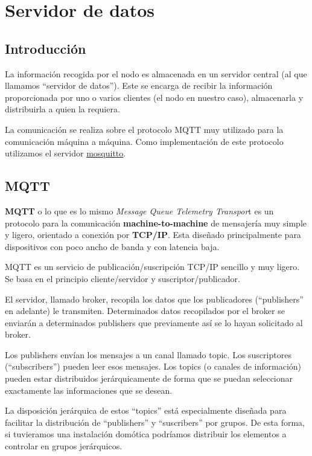 \cleardoublepage

\chapter{Servidor de datos}
\label{makereference3}

\section{Introducción}
\label{makereference3.1}
La información recogida por el nodo es almacenada en un servidor central (al que llamamos ``servidor de datos''). Este se encarga de recibir la información proporcionada por uno o varios clientes (el nodo en nuestro caso), almacenarla y distribuirla a quien la requiera.

La comunicación se realiza sobre el protocolo MQTT muy utilizado para la comunicación máquina a máquina. Como implementación de este protocolo utilizamos el servidor \href{https://mosquitto.org/}{mosquitto}.

\section{MQTT}
\label{makereference3.2}
\textbf{MQTT} o lo que es lo mismo \textit{Message Queue Telemetry Transpor}t es un protocolo para la comunicación \textbf{machine-to-machine} de mensajería muy simple y ligero, orientado a conexión por \textbf{TCP/IP}. Esta diseñado principalmente para dispositivos con poco ancho de banda y con latencia baja.

MQTT es un servicio de publicación/suscripción TCP/IP sencillo y muy ligero. Se basa en el principio cliente/servidor y suscriptor/publicador.

El servidor, llamado broker, recopila los datos que los publicadores (``publishers'' en adelante) le transmiten. Determinados datos recopilados por el broker se enviarán a determinados publishers que previamente así se lo hayan solicitado al broker.

Los publishers envían los mensajes a un canal llamado topic. Los suscriptores (``subscribers'') pueden leer esos mensajes. Los topics (o canales de información) pueden estar distribuidos jerárquicamente de forma que se puedan seleccionar exactamente las informaciones que se desean.

La disposición jerárquica de estos ``topics'' está especialmente diseñada para facilitar la distribución de ``publishers'' y ``suscribers'' por grupos. De esta forma, si tuvieramos una instalación domótica podríamos distribuir los elementos a controlar en grupos jerárquicos.

